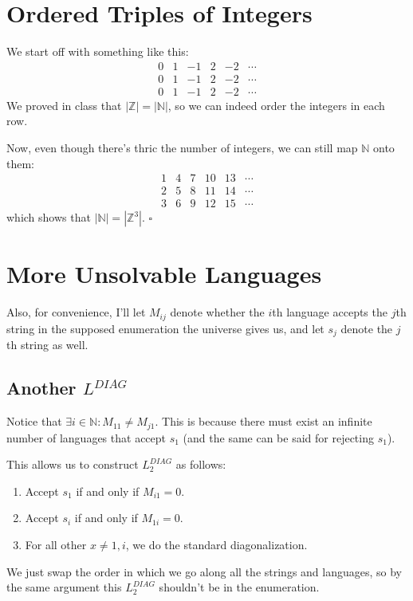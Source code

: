\documentclass[12pt]{article}
\newcommand{\N}{\mathbb{N}}
\begin{document}
\section{Ordered Triples of Integers}

We start off with something like this:
\[\begin{array}{cccccc}
        0 & 1 & -1 & 2 & -2 & \cdots \\
        0 & 1 & -1 & 2 & -2 & \cdots \\
        0 & 1 & -1 & 2 & -2 & \cdots
    \end{array}\]
We proved in class that $|\mathbb{Z}|=|\N|$, so
we can indeed order the integers in each row.

Now, even though there's thric the number of integers,
we can still map $\N$ onto them:
\[\begin{array}{cccccc}
        1 & 4 & 7 & 10 & 13 & \cdots \\
        2 & 5 & 8 & 11 & 14 & \cdots \\
        3 & 6 & 9 & 12 & 15 & \cdots
    \end{array}\]
which shows that $|\N|=\left|\mathbb{Z}^3\right|$. $\square$

\section{More Unsolvable Languages}

Also, for convenience, I'll let $M_{ij}$ denote whether the $i$th language accepts
the $j$th string in the supposed enumeration the universe gives us,
and let $s_j$ denote the $j$th string as well.

\subsection{Another \texorpdfstring{$L^{DIAG}$}{L\^DIAG}}\label{sec:onemore}

Notice that $\exists i \in \N: M_{11} \ne M_{j1}$.
This is because there must exist an infinite number
of languages that accept $s_1$ (and the same can be said for rejecting $s_1$).

This allows us to construct $L_2^{DIAG}$ as follows:
\begin{enumerate}[nolistsep]
    \item Accept $s_1$ if and only if $M_{i1}=0$.
    \item Accept $s_i$ if and only if $M_{1i}=0$.
    \item For all other $x \ne 1, i$, we do the standard diagonalization.
\end{enumerate}
We just swap the order in which we go along all the strings and languages,
so by the same argument this $L_2^{DIAG}$ shouldn't be in the enumeration.
\end{document}
